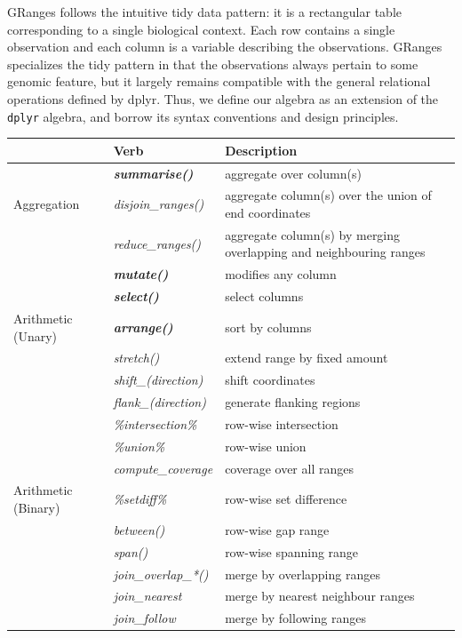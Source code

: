 \documentclass[]{article}
\begin{document}
GRanges follows the intuitive tidy data pattern: it is a rectangular
table corresponding to a single biological context. Each row contains a
single observation and each column is a variable describing the
observations. GRanges specializes the tidy pattern in that the
observations always pertain to some genomic feature, but it largely
remains compatible with the general relational operations defined by
dplyr. Thus, we define our algebra as an extension of the \texttt{dplyr}
algebra, and borrow its syntax conventions and design principles.

\begin{table}[!htbp]
\centering
\begin{tabular}{|l|l|p{6cm}|}
  \hline
  & Verb &  Description \\ 
  \hline
   & \textbf{\emph{summarise()}} & aggregate over column(s) \\ 
   Aggregation & \emph{disjoin\_ranges()} & aggregate column(s) over the union of end coordinates \\
   &  \emph{reduce\_ranges()} & aggregate column(s) by merging overlapping and neighbouring ranges \\
   \hline
   &  \textbf{\emph{mutate()}} & modifies any column \\
   & \textbf{\emph{select()}} & select columns \\
  Arithmetic (Unary) & \textbf{\emph{arrange()}} & sort by columns \\
   & \emph{stretch()} & extend range by fixed amount \\
   &  \emph{shift\_(direction)} & shift coordinates \\
   & \emph{flank\_(direction)} & generate flanking regions \\
   & \emph{\%intersection\% } & row-wise intersection \\
   & \emph{\%union\%} & row-wise union \\
   & \emph{compute\_coverage} & coverage over all ranges \\
  Arithmetic (Binary) &  \emph{\%setdiff\%} & row-wise set difference \\
   & \emph{between()} & row-wise gap range \\
   & \emph{span()} & row-wise spanning range \\
   \hline
    & \emph{join\_overlap\_*()} & merge by overlapping ranges \\
    & \emph{join\_nearest} & merge by nearest neighbour ranges \\
    & \emph{join\_follow} & merge by following ranges \\

\end{tabular}
\end{table}
\end{document}
